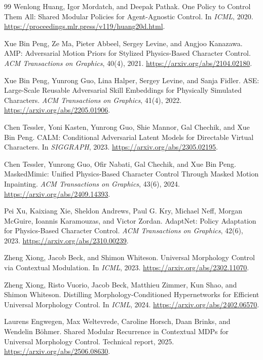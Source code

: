 \begin{thebibliography}{99}
Wenlong Huang, Igor Mordatch, and Deepak Pathak.
One Policy to Control Them All: Shared Modular Policies for
Agent-Agnostic Control.
In \emph{ICML}, 2020.
\url{https://proceedings.mlr.press/v119/huang20d.html}.

Xue Bin Peng, Ze Ma, Pieter Abbeel, Sergey Levine, and Angjoo Kanazawa.
AMP: Adversarial Motion Priors for Stylized Physics-Based Character Control.
\emph{ACM Transactions on Graphics}, 40(4), 2021.
\url{https://arxiv.org/abs/2104.02180}.

Xue Bin Peng, Yunrong Guo, Lina Halper, Sergey Levine, and Sanja Fidler.
ASE: Large-Scale Reusable Adversarial Skill Embeddings for Physically
Simulated Characters.
\emph{ACM Transactions on Graphics}, 41(4), 2022.
\url{https://arxiv.org/abs/2205.01906}.

Chen Tessler, Yoni Kasten, Yunrong Guo, Shie Mannor, Gal Chechik,
and Xue Bin Peng.
CALM: Conditional Adversarial Latent Models for Directable Virtual
Characters.
In \emph{SIGGRAPH}, 2023.
\url{https://arxiv.org/abs/2305.02195}.

Chen Tessler, Yunrong Guo, Ofir Nabati, Gal Chechik, and Xue Bin Peng.
MaskedMimic: Unified Physics-Based Character Control Through Masked
Motion Inpainting.
\emph{ACM Transactions on Graphics}, 43(6), 2024.
\url{https://arxiv.org/abs/2409.14393}.

Pei Xu, Kaixiang Xie, Sheldon Andrews, Paul G. Kry, Michael Neff,
Morgan McGuire, Ioannis Karamouzas, and Victor Zordan.
AdaptNet: Policy Adaptation for Physics-Based Character Control.
\emph{ACM Transactions on Graphics}, 42(6), 2023.
\url{https://arxiv.org/abs/2310.00239}.

Zheng Xiong, Jacob Beck, and Shimon Whiteson.
Universal Morphology Control via Contextual Modulation.
In \emph{ICML}, 2023.
\url{https://arxiv.org/abs/2302.11070}.

Zheng Xiong, Risto Vuorio, Jacob Beck, Matthieu Zimmer, Kun Shao,
and Shimon Whiteson.
Distilling Morphology-Conditioned Hypernetworks for Efficient Universal
Morphology Control.
In \emph{ICML}, 2024.
\url{https://arxiv.org/abs/2402.06570}.

Laurens Engwegen, Max Weltevrede, Caroline Horsch, Daan Brinks,
and Wendelin B\"{o}hmer.
Shared Modular Recurrence in Contextual MDPs for Universal Morphology
Control.
Technical report, 2025.
\url{https://arxiv.org/abs/2506.08630}.


\end{thebibliography}

